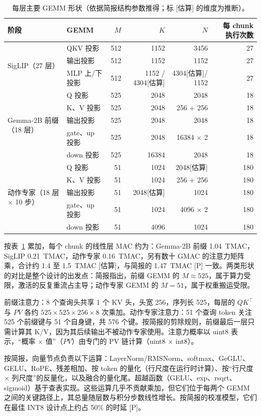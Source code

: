 \documentclass[a4paper,10.5pt]{ctexart}
\newcommand{\tP}{\textsf{[P]}}              %
\newcommand{\tE}{\textsf{[估算]}}           %
\begin{document}
\begin{table}[t]
\centering
\caption{每层主要 GEMM 形状（依据简报结构参数推得；标 \tE{} 的维度为推断）。}
\label{tab:gemm}
\small
\begin{tabular}{l l r r r r}
\toprule
阶段 & GEMM & $M$ & $K$ & $N$ & 每 chunk 执行次数 \\
\midrule
\multirow{3}{*}{SigLIP（27 层）} & QKV 投影 & 512 & 1152 & 3456 & 27 \\
 & 输出投影 & 512 & 1152 & 1152 & 27 \\
 & MLP 上/下投影 & 512 & 1152 / 4304\tE & 4304\tE / 1152 & 27 \\
\midrule
\multirow{5}{*}{Gemma-2B 前缀（18 层）} & Q 投影 & 525 & 2048 & 2048 & 18 \\
 & K、V 投影 & 525 & 2048 & 256 + 256 & 18 \\
 & 输出投影 & 525 & 2048 & 2048 & 18 \\
 & gate、up 投影 & 525 & 2048 & 16384 $\times$ 2 & 18 \\
 & down 投影 & 525 & 16384 & 2048 & 18 \\
\midrule
\multirow{5}{*}{动作专家（18 层 $\times$ 10 步）} & Q 投影 & 51 & 1024 & 2048\tE & 180 \\
 & K、V 投影 & 51 & 1024 & 256 + 256 & 180 \\
 & 输出投影 & 51 & 2048\tE & 1024 & 180 \\
 & gate、up 投影 & 51 & 1024 & 4096 $\times$ 2 & 180 \\
 & down 投影 & 51 & 4096 & 1024 & 180 \\
\bottomrule
\end{tabular}
\end{table}

按表~\ref{tab:gemm} 累加，每个 chunk 的线性层 MAC 约为：Gemma-2B 前缀 1.04~TMAC，SigLIP 0.21~TMAC，动作专家 0.16~TMAC，另有数十 GMAC 的注意力矩阵乘，合计约 1.4 至 1.5~TMAC \tE，与简报的 1.47~TMAC \tP{} 一致。两类形状的对比是整个设计的出发点：简报指出，前缀 GEMM 的 $M\approx525$，属于算力受限，激活的反复重流占主导；动作专家 GEMM 的 $M=51$，属于权重搬运受限。

前缀注意力：8 个查询头共享 1 个 KV 头，头宽 256，序列长 525，每层的 $QK^\top$ 与 $PV$ 各约 $525\times525\times256\times8$ 次乘加。动作专家注意力：51 个查询 token 关注 525 个前缀键与 51 个自身键，共 576 个键。按简报的剪除规则，前缀最后一层只需计算其 K/V，因为其后续输出不被动作专家使用。注意力概率以 uint8 表示，“概率 $\times$ 值”（$PV$）由专门的 PV 链计算（uint8 $\times$ int8）。

按简报，向量节点负责以下运算：LayerNorm/RMSNorm、softmax、GeGLU、GELU、RoPE、残差相加、按 token 的量化（行尺度在运行时计算）、按“行尺度 $\times$ 列尺度”的反量化，以及融合的量化尾。超越函数（GELU、exp、rsqrt、sigmoid）基于查表实现。这些运算几乎不贡献乘加，但它们位于每两个 GEMM 之间的关键路径上，其总量随层数与积分步数线性增长。按简报的校准模型，它们在最佳 INT8 设计点上约占 50\% 的时延 \tP。
\end{document}
